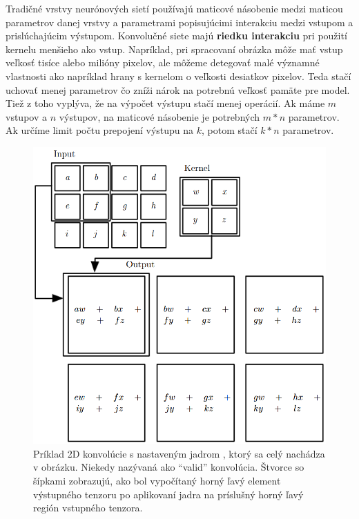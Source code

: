 Tradičné vrstvy neurónových sietí používajú maticové násobenie medzi maticou parametrov danej vrstvy a parametrami popisujúcimi interakciu medzi vstupom a prislúchajúcim výstupom. Konvolučné siete majú {\bf riedku interakciu} pri použití kernelu menšieho ako vstup. Napríklad, pri spracovaní obrázka môže mať vstup veľkosť tisíce alebo milióny pixelov, ale môžeme detegovať malé významné vlastnosti ako napríklad hrany s kernelom o veľkosti desiatkov pixelov. Teda stačí uchovať menej parametrov čo zníži nárok na potrebnú veľkosť pamäte pre model. Tiež z toho vyplýva, že na výpočet výstupu stačí menej operácií. Ak máme $m$ vstupov a $n$ výstupov, na maticové násobenie je potrebných $m * n$ parametrov. Ak určíme limit počtu prepojení výstupu na $k$, potom stačí $k * n$ parametrov.

\begin{figure}[H]
	\begin{center}
		\includegraphics[width=\textwidth]{images/31CNN.png}
		\caption{Príklad 2D konvolúcie s nastaveným jadrom \cite{Goodfellow-et-al-2016}, ktorý sa celý nachádza v obrázku. Niekedy nazývaná ako ``valid'' konvolúcia. Štvorce so šípkami zobrazujú, ako bol vypočítaný horný ľavý element výstupného tenzoru po aplikovaní jadra na príslušný horný ľavý región vstupného tenzora. }
		\label{img:31CNN}
	\end{center}
\end{figure}

